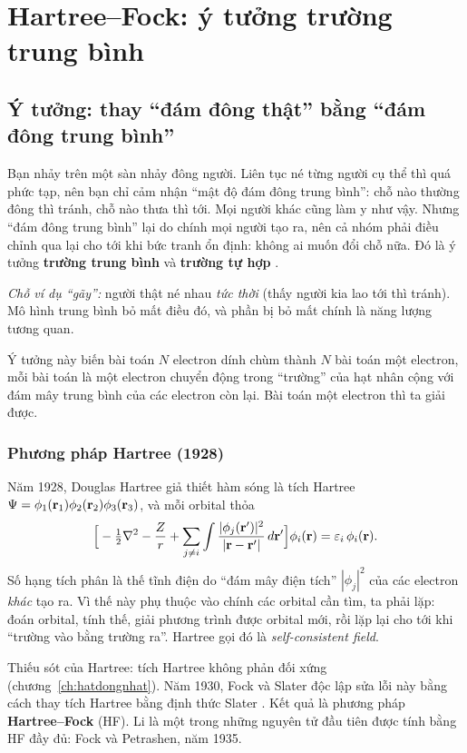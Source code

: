 \chapter{Hartree--Fock: ý tưởng trường trung bình}
\label{ch:hf}

\section{Ý tưởng: thay ``đám đông thật'' bằng ``đám đông trung bình''}

\begin{eli5}
Bạn nhảy trên một sàn nhảy đông người. Liên tục né từng người cụ thể thì quá phức tạp, nên bạn chỉ cảm nhận ``mật độ đám đông trung bình'': chỗ nào thường đông thì tránh, chỗ nào thưa thì tới. Mọi người khác cũng làm y như vậy. Nhưng ``đám đông trung bình'' lại do chính mọi người tạo ra, nên cả nhóm phải điều chỉnh qua lại cho tới khi bức tranh ổn định: không ai muốn đổi chỗ nữa. Đó là ý tưởng \textbf{trường trung bình}  và \textbf{trường tự hợp} .

\emph{Chỗ ví dụ ``gãy'':} người thật né nhau \emph{tức thời} (thấy người kia lao tới thì tránh). Mô hình trung bình bỏ mất điều đó, và phần bị bỏ mất chính là năng lượng tương quan.
\end{eli5}

Ý tưởng này biến bài toán $N$ electron dính chùm thành $N$ bài toán một electron, mỗi bài toán là một electron chuyển động trong ``trường'' của hạt nhân cộng với đám mây trung bình của các electron còn lại. Bài toán một electron thì ta giải được.

\subsection{Phương pháp Hartree (1928)}
Năm 1928, Douglas Hartree giả thiết hàm sóng là tích Hartree $\Psi=\phi_1(\mathbf r_1)\phi_2(\mathbf r_2)\phi_3(\mathbf r_3)$, và mỗi orbital thỏa \cite{Hartree1928a}
\[
\Big[-\tfrac12\nabla^2-\frac{Z}{r}+\sum_{j\neq i}\int\frac{|\phi_j(\mathbf r')|^2}{|\mathbf r-\mathbf r'|}\,d\mathbf r'\Big]\phi_i(\mathbf r)=\varepsilon_i\,\phi_i(\mathbf r).
\]
Số hạng tích phân là thế tĩnh điện do ``đám mây điện tích'' $|\phi_j|^2$ của các electron \emph{khác} tạo ra. Vì thế này phụ thuộc vào chính các orbital cần tìm, ta phải lặp: đoán orbital, tính thế, giải phương trình được orbital mới, rồi lặp lại cho tới khi ``trường vào bằng trường ra''. Hartree gọi đó là \emph{self-consistent field}.

Thiếu sót của Hartree: tích Hartree không phản đối xứng (chương~\ref{ch:hatdongnhat}). Năm 1930, Fock và Slater độc lập sửa lỗi này bằng cách thay tích Hartree bằng định thức Slater \cite{Fock1930,Slater1930}. Kết quả là phương pháp \textbf{Hartree--Fock} (HF). Li là một trong những nguyên tử đầu tiên được tính bằng HF đầy đủ: Fock và Petrashen, năm 1935.


